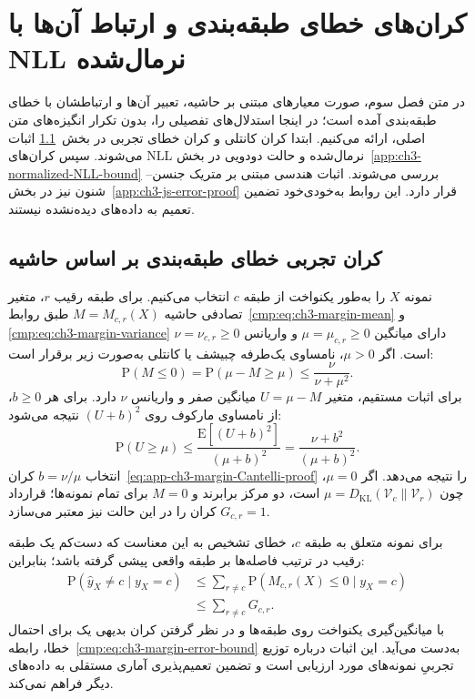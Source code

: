 \section{کران‌های خطای طبقه‌بندی و ارتباط آن‌ها با NLL نرمال‌شده}
\label{app:ch3-supplementary-error-bounds}
در متن فصل سوم، صورت معیارهای مبتنی بر حاشیه،
تعبیر آن‌ها و ارتباطشان با خطای طبقه‌بندی آمده است؛
در اینجا استدلال‌های تفصیلی را، بدون تکرار انگیزه‌های
متن اصلی، ارائه می‌کنیم. ابتدا
کران کانتلی و کران خطای تجربی در
بخش~\ref{app:ch3-margin-error} اثبات می‌شوند.
سپس کران‌های NLL نرمال‌شده و حالت دودویی در
بخش~\ref{app:ch3-normalized-NLL-bound} بررسی می‌شوند.
اثبات هندسی مبتنی بر متریک جنسن--شنون نیز در
بخش~\ref{app:ch3-js-error-proof} قرار دارد.
این روابط به‌خودی‌خود تضمین تعمیم به داده‌های
دیده‌نشده نیستند.

\subsection{کران تجربی خطای طبقه‌بندی بر اساس حاشیه}
\label{app:ch3-margin-error}
نمونه $X$ را به‌طور یکنواخت از طبقه $c$ انتخاب می‌کنیم. برای طبقه رقیب $r$، متغیر تصادفی حاشیه $M=M_{c,r}(X)$ طبق روابط~\eqref{cmp:eq:ch3-margin-mean} و \eqref{cmp:eq:ch3-margin-variance} دارای میانگین $\mu=\mu_{c,r}\ge0$ و واریانس $\nu=\nu_{c,r}\ge0$ است. اگر $\mu>0$، نامساوی یک‌طرفه چبیشف یا کانتلی به‌صورت زیر برقرار است:
\begin{equation}\label{eq:app-ch3-margin-Cantelli-proof}
\mathrm P(M\le0)
=\mathrm P(\mu-M\ge\mu)
\le\frac{\nu}{\nu+\mu^2}.
\end{equation}
برای اثبات مستقیم، متغیر $U=\mu-M$ میانگین صفر و واریانس $\nu$ دارد. برای هر $b\ge0$، از نامساوی مارکوف روی $(U+b)^2$ نتیجه می‌شود:
\[
\mathrm P(U\ge\mu)\le
\frac{\mathrm E[(U+b)^2]}{(\mu+b)^2}
=\frac{\nu+b^2}{(\mu+b)^2}.
\]
انتخاب $b=\nu/\mu$ کران~\eqref{eq:app-ch3-margin-Cantelli-proof} را نتیجه می‌دهد. اگر $\mu=0$، چون
$\mu=D_{\mathrm{KL}}(\mathcal V_c\|\mathcal V_r)$ است، دو مرکز برابرند و $M=0$ برای تمام نمونه‌ها؛ قرارداد $G_{c,r}=1$ کران را در این حالت نیز معتبر می‌سازد.

برای نمونه متعلق به طبقه $c$، خطای تشخیص به این معناست که دست‌کم یک طبقه رقیب در ترتیب فاصله‌ها بر طبقه واقعی پیشی گرفته باشد؛ بنابراین:
\begin{equation}\label{eq:app-ch3-margin-union}
\begin{aligned}
\mathrm P(\widehat y_X\ne c\mid y_X=c)
&\le\sum_{r\ne c}
\mathrm P(M_{c,r}(X)\le0\mid y_X=c)\\
&\le\sum_{r\ne c}G_{c,r}.
\end{aligned}
\end{equation}
با میانگین‌گیری یکنواخت روی طبقه‌ها و در نظر گرفتن کران بدیهی یک برای احتمال خطا، رابطه~\eqref{cmp:eq:ch3-margin-error-bound} به‌دست می‌آید. این اثبات درباره توزیع تجربیِ نمونه‌های مورد ارزیابی است و تضمین تعمیم‌پذیری آماری مستقلی به داده‌های دیگر فراهم نمی‌کند.





